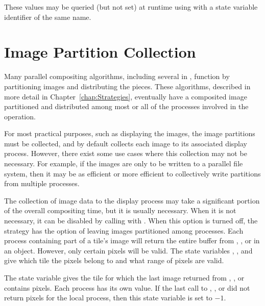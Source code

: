 These values may be queried (but not set) at runtime using 
with a state variable identifier of the same name.


\section{Image Partition Collection}
\label{sec:Customizing_Compositing:Image_Collection}

Many parallel compositing algorithms, including several in \IceT, function
by partitioning images and distributing the pieces.  These algorithms,
described in more detail in Chapter~\ref{chap:Strategies}, eventually have
a composited image partitioned and distributed among most or all of the
processes involved in the operation.

For most practical purposes, such as displaying the images, the image
partitions must be collected, and by default \IceT collects each image to
its associated display process.  However, there exist some use cases where
this collection may not be necessary.  For example, if the images are only
to be written to a parallel file system, then it may be as efficient or
more efficient to collectively write partitions from multiple processes.

The collection of image data to the display process may take a significant
portion of the overall compositing time, but it is usually necessary.  When
it is not necessary, it can be disabled by calling  with
.  When this option is turned off, the
strategy has the option of leaving images partitioned among processes.
Each process containing part of a tile's image will return the entire
buffer from , , or
 in an  object.  However, only
certain pixels will be valid.  The state variables
, , and
 give which tile the pixels belong to and
what range of pixels are valid.

The  state variable gives the tile for
which the last image returned from ,
, or  contains pixels.
Each process has its own value.  If the last call to ,
, or  did not return
pixels for the local process, then this state variable is set to $-1$.

